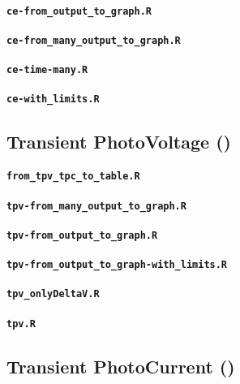 \paragraph{\texttt{ce-from_output_to_graph.R}}
\paragraph{\texttt{ce-from_many_output_to_graph.R}}
\paragraph{\texttt{ce-time-many.R}}
\paragraph{\texttt{ce-with_limits.R}}

\subsection{Transient PhotoVoltage ()}\label{r_tpv}

\paragraph{\texttt{from_tpv_tpc_to_table.R}}
\paragraph{\texttt{tpv-from_many_output_to_graph.R}}
\paragraph{\texttt{tpv-from_output_to_graph.R}}
\paragraph{\texttt{tpv-from_output_to_graph-with_limits.R}}
\paragraph{\texttt{tpv_onlyDeltaV.R}}
\paragraph{\texttt{tpv.R}}



\subsection{Transient PhotoCurrent ()}\label{r_tpc}


